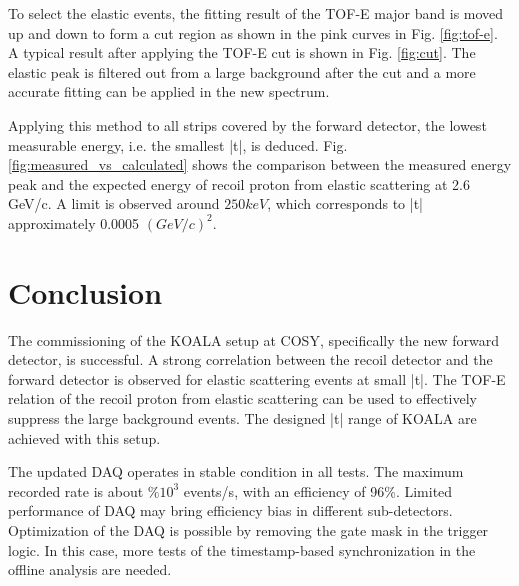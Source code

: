 \documentclass[number]{elsarticle}
\begin{document}
To select the elastic events, the fitting result of the TOF-E major band is moved up and down to form a cut region as shown in the pink curves in Fig. \ref{fig:tof-e}.
A typical result after applying the TOF-E cut is shown in Fig. \ref{fig:cut}.
The elastic peak is filtered out from a large background after the cut and a more accurate fitting can be applied in the new spectrum.

Applying this method to all strips covered by the forward detector, the lowest measurable energy, i.e. the smallest |t|, is deduced.
Fig. \ref{fig:measured_vs_calculated} shows the comparison between the measured energy peak and the expected energy of recoil proton from elastic scattering at 2.6 GeV/c.
A limit is observed around \(250 keV\), which corresponds to |t| approximately 0.0005 \((GeV/c)^2\).

\section{Conclusion}
\label{sec:conclusion}

The commissioning of the KOALA setup at COSY, specifically the new forward detector, is successful.
A strong correlation between the recoil detector and the forward detector is observed for elastic scattering events at small |t|.
The TOF-E relation of the recoil proton from elastic scattering can be used to effectively suppress the large background events.
The designed |t| range of KOALA are achieved with this setup.

The updated DAQ operates in stable condition in all tests.
The maximum recorded rate is about $\%10^3$ events/s, with an efficiency of 96\%.
Limited performance of DAQ may bring efficiency bias in different sub-detectors.
Optimization of the DAQ is possible by removing the gate mask in the trigger logic.
In this case, more tests of the timestamp-based synchronization in the offline analysis are needed.



\end{document}
